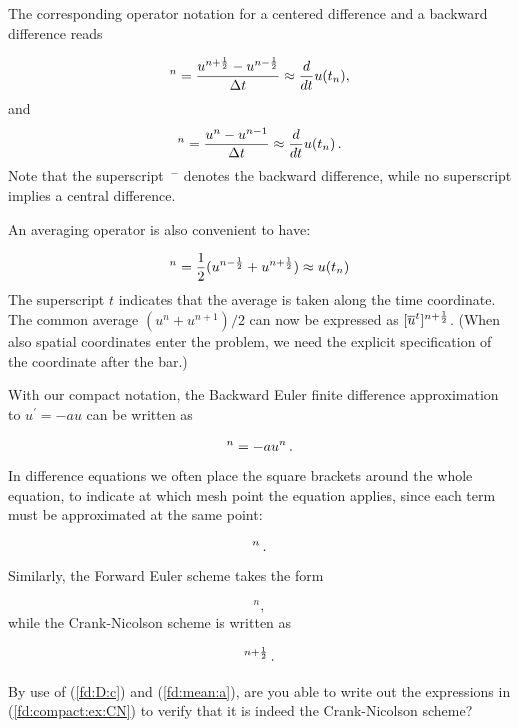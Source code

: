 \documentclass[%
oneside,                 %
final,                   %
10pt]{article}
\newenvironment{question_mdfboxadmon}[1][]{
\begin{question_mdfboxmdframed}[frametitle=#1]
}
{
\end{question_mdfboxmdframed}
}
\begin{document}
The corresponding operator notation for a centered difference and
a backward difference reads

\begin{equation}
[D_tu]^n = \frac{u^{n+\half} - u^{n-\half}}{\Delta t}
\approx \frac{d}{dt} u(t_n), \label{fd:D:c}
\end{equation}
and
\begin{equation}
[D_t^-u]^n = \frac{u^{n} - u^{n-1}}{\Delta t}
\approx \frac{d}{dt} u(t_n) \label{fd:D:b}
\tp
\end{equation}
Note that the superscript $\,{}^-$ denotes the backward
difference, while no superscript implies a central difference.

An averaging operator is also convenient to have:

\begin{equation}
[\overline{u}^{t}]^n = \half (u^{n-\half} + u^{n+\half} )
\approx u(t_n) \label{fd:mean:a}
\end{equation}
The superscript $t$ indicates that the average is taken along the time
coordinate. The common average $(u^n + u^{n+1})/2$ can now be
expressed as $[\overline{u}^{t}]^{n+\frac{1}{2}}$. (When also spatial coordinates
enter the problem, we need the explicit specification of the coordinate
after the bar.)


With our compact notation, the Backward Euler finite difference approximation to $u^{\prime}=-au$ can be written
as

\begin{equation*}
[D_t^-u]^n = -au^n \tp
\end{equation*}
In difference equations we often place the square brackets around
the whole equation, to indicate at which mesh point the equation applies,
since each term must be approximated at the same point:

\begin{equation}
[D_t^- u  = -au]^n \tp
\end{equation}
Similarly, the Forward Euler scheme takes the form

\begin{equation}
[D_t^+ u  = -au]^n,
\end{equation}
while the Crank-Nicolson scheme is written as

\begin{equation}
[D_t u = -a\overline{u}^t]^{n+\half}\tp
\label{fd:compact:ex:CN}
\end{equation}


\begin{question_mdfboxadmon}[Question:]
By use of (\ref{fd:D:c}) and (\ref{fd:mean:a}), are you able to
write out the expressions in (\ref{fd:compact:ex:CN}) to verify that
it is indeed the Crank-Nicolson scheme?
\end{question_mdfboxadmon}
\end{document}
